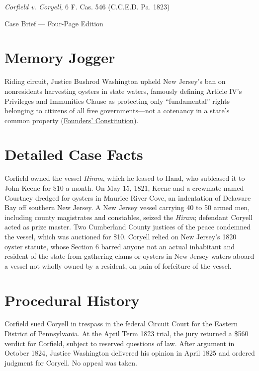\documentclass[12pt]{article}
\begin{document}
\begin{center}
{\LARGE \textit{Corfield v. Coryell}, 6 F. Cas. 546 (C.C.E.D. Pa. 1823)\par}
\vspace{0.8em}
{\large Case Brief --- Four-Page Edition\par}
\end{center}
\vspace{1em}

\section{Memory Jogger}

Riding circuit, Justice Bushrod Washington upheld New Jersey's ban on nonresidents harvesting oysters in state waters, famously defining Article IV's Privileges and Immunities Clause as protecting only ``fundamental'' rights belonging to citizens of all free governments---not a cotenancy in a state's common property (\href{https://press-pubs.uchicago.edu/founders/documents/a4_2_1s18.html}{Founders' Constitution}).

\section{Detailed Case Facts}

Corfield owned the vessel \textit{Hiram}, which he leased to Hand, who subleased it to John Keene for \$10 a month. On May 15, 1821, Keene and a crewmate named Courtney dredged for oysters in Maurice River Cove, an indentation of Delaware Bay off southern New Jersey. A New Jersey vessel carrying 40 to 50 armed men, including county magistrates and constables, seized the \textit{Hiram}; defendant Coryell acted as prize master. Two Cumberland County justices of the peace condemned the vessel, which was auctioned for \$10. Coryell relied on New Jersey's 1820 oyster statute, whose Section 6 barred anyone not an actual inhabitant and resident of the state from gathering clams or oysters in New Jersey waters aboard a vessel not wholly owned by a resident, on pain of forfeiture of the vessel.

\section{Procedural History}

Corfield sued Coryell in trespass in the federal Circuit Court for the Eastern District of Pennsylvania. At the April Term 1823 trial, the jury returned a \$560 verdict for Corfield, subject to reserved questions of law. After argument in October 1824, Justice Washington delivered his opinion in April 1825 and ordered judgment for Coryell. No appeal was taken.
\end{document}
